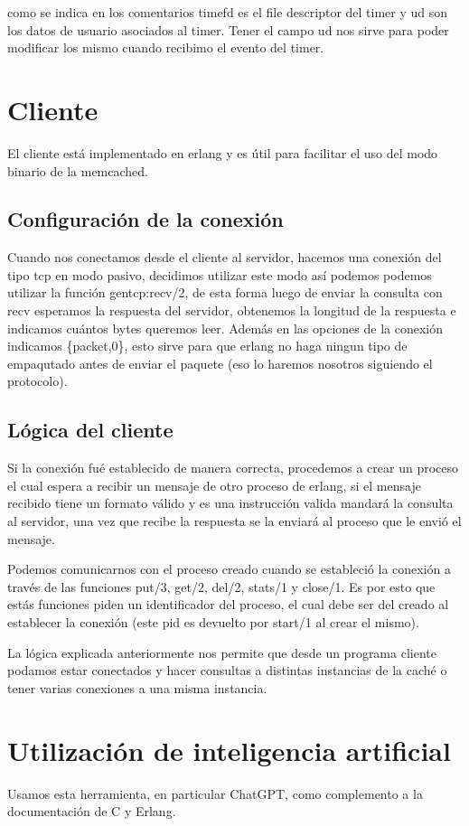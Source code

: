 \documentclass{article}
\begin{document}
como se indica en los comentarios timefd es el file
descriptor del timer y ud son los datos de usuario
asociados al timer. Tener el campo ud nos sirve para poder
modificar los mismo cuando recibimo el evento del timer.

\section{Cliente}
El cliente está implementado en erlang y es útil para facilitar el uso del modo binario de la memcached.

\subsection{Configuración de la conexión}
Cuando nos conectamos desde el cliente al servidor,
hacemos una conexión del tipo tcp en modo pasivo,
decidimos utilizar este modo así podemos podemos
utilizar la función gen\textunderscore tcp:recv/2,
de esta forma luego de enviar la consulta con recv
esperamos la respuesta del servidor, obtenemos
la longitud de la respuesta e indicamos cuántos
bytes queremos leer. Además en las opciones
de la conexión indicamos \{packet,0\}, esto sirve
para que erlang no haga ningun tipo de empaqutado
antes de enviar el paquete (eso lo haremos nosotros
siguiendo el protocolo).

\subsection{Lógica del cliente}
Si la conexión fué establecido de manera
correcta, procedemos a crear un proceso el
cual espera a recibir un mensaje de otro proceso
de erlang, si el mensaje recibido tiene un formato
válido y es una instrucción valida mandará la consulta
al servidor, una vez que recibe la respuesta se la
enviará al proceso que le envió el mensaje.

Podemos comunicarnos con el proceso creado cuando
se estableció la conexión a través de las funciones
put/3, get/2, del/2, stats/1 y close/1. Es por esto
que estás funciones piden un identificador del proceso,
el cual debe ser del creado al establecer la conexión
(este pid es devuelto por start/1 al crear el mismo).

La lógica explicada anteriormente nos permite que desde
un programa cliente podamos estar conectados y hacer
consultas a distintas instancias de la caché o tener
varias conexiones a una misma instancia.

\section*{Utilización de inteligencia artificial}
Usamos esta herramienta, en particular ChatGPT,
como complemento a la documentación de C y Erlang.



\cite{herlihy2020art}
\cite{michael2010linux}
\cite{virding1996concurrent}
\end{document}
